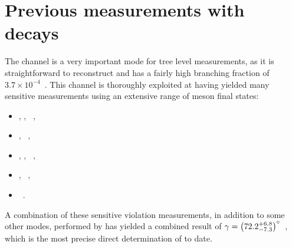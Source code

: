 \section{Previous \Pgamma measurements with  decays}


The \decay{\Bm}{\D\Km} channel is a very important mode for tree level \Pgamma measurements, as it is straightforward to reconstruct and has a fairly high branching fraction of $3.7 \times 10^{-4}$~\cite{PDG2016}. This \decay{\Bm}{\D\Km} channel is thoroughly exploited at \lhcb having yielded many \Pgamma sensitive measurements using an extensive range of \D meson final states:
\begin{itemize}
\item \decay{\D}{\Kp\pim}, \Kp\Km, \pip\pim~\cite{LHCb-PAPER-2017-021},
\item \decay{\D}{\Kp\pim\pip\pim}, \pip\pim\pip\pim~\cite{LHCb-PAPER-2016-003},
\item \decay{\D}{\Kp\pim\piz}, \Kp\Km\piz, \pip\pim\piz~\cite{LHCb-PAPER-2015-014},
\item \decay{\D}{\KS\Kp\Km}, \KS\pip\pim~\cite{LHCb-PAPER-2014-041},
\item \decay{\D}{\KS\Kp\pim}~\cite{LHCb-PAPER-2013-068}.
\end{itemize}
A combination of these \Pgamma sensitive \CP violation measurements, in addition to some other modes, performed by \lhcb has yielded a combined result of $\gamma = \left(72.2^{+6.8}_{-7.3}\right)^{\circ}$~\cite{LHCb-PAPER-2016-032}, which is the most precise direct determination of \Pgamma to date.

